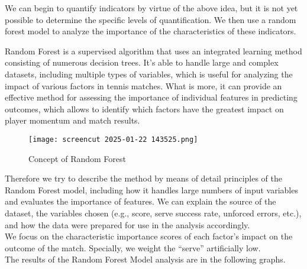 \documentclass{mcmthesis}
\begin{document}
We can begin to quantify indicators by virtue of the above idea, but it is not yet possible to
determine the specific levels of quantification. We then use a random forest model to analyze the
importance of the characteristics of these indicators. 

Random Forest is a supervised algorithm that uses an integrated learning method consisting
of numerous decision trees. It's able to handle large and complex datasets, including multiple
types of variables, which is useful for analyzing the impact of various factors in tennis matches. What is more, it can provide an effective method for assessing the importance of individual
features in predicting outcomes, which allows to identify which factors have the greatest impact
on player momentum and match results.\cite{[4]}

\begin{figure}[htbp]
    \centering
    \texttt{[image: screencut 2025-01-22 143525.png]}
    \caption{Concept of Random Forest} \label{Figure 3}
\end{figure}

Therefore we try to describe the method by means of detail principles of the Random Forest
model, including how it handles large numbers of input variables and evaluates the importance of
features. We can explain the source of the dataset, the variables chosen (e.g., score, serve success
rate, unforced errors, etc.), and how the data were prepared for use in the analysis accordingly.\\
We focus on the characteristic importance scores of each factor's impact on the outcome of
the match. Specially, we weight the “serve” artificially low.\\
The results of the Random Forest Model analysis are in the following graphs.
\end{document}
